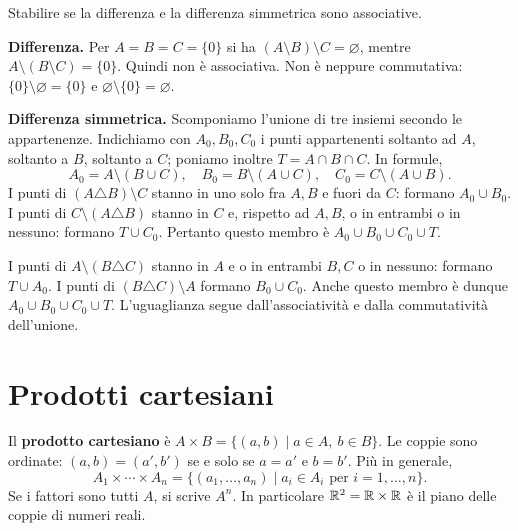 \begin{esercizio}
Stabilire se la differenza e la differenza simmetrica sono associative.
\end{esercizio}
\begin{svolgimento}
\textbf{Differenza.} Per $A=B=C=\{0\}$ si ha $(A\setminus B)\setminus C=\varnothing$, mentre $A\setminus(B\setminus C)=\{0\}$. Quindi non è associativa. Non è neppure commutativa: $\{0\}\setminus\varnothing=\{0\}$ e $\varnothing\setminus\{0\}=\varnothing$.

\textbf{Differenza simmetrica.} Scomponiamo l'unione di tre insiemi secondo le appartenenze. Indichiamo con $A_0,B_0,C_0$ i punti appartenenti soltanto ad $A$, soltanto a $B$, soltanto a $C$; poniamo inoltre $T=A\cap B\cap C$. In formule,
\[
A_0=A\setminus(B\cup C),\quad B_0=B\setminus(A\cup C),\quad C_0=C\setminus(A\cup B).
\]
 I punti di $(A\triangle B)\setminus C$ stanno in uno solo fra $A,B$ e fuori da $C$: formano $A_0\cup B_0$. I punti di $C\setminus(A\triangle B)$ stanno in $C$ e, rispetto ad $A,B$, o in entrambi o in nessuno: formano $T\cup C_0$. Pertanto questo membro è $A_0\cup B_0\cup C_0\cup T$.

 I punti di $A\setminus(B\triangle C)$ stanno in $A$ e o in entrambi $B,C$ o in nessuno: formano $T\cup A_0$. I punti di $(B\triangle C)\setminus A$ formano $B_0\cup C_0$. Anche questo membro è dunque $A_0\cup B_0\cup C_0\cup T$. L'uguaglianza segue dall'associatività e dalla commutatività dell'unione.
\end{svolgimento}

\begin{schema}
\end{schema}

\section{Prodotti cartesiani}
\begin{definizione}
Il \textbf{prodotto cartesiano} è $A\times B=\{(a,b)\mid a\in A,\ b\in B\}$. Le coppie sono ordinate: $(a,b)=(a',b')$ se e solo se $a=a'$ e $b=b'$. Più in generale,
\[
A_1\times\cdots\times A_n=\{(a_1,\ldots,a_n)\mid a_i\in A_i\text{ per }i=1,\ldots,n\}.
\]
Se i fattori sono tutti $A$, si scrive $A^n$. In particolare $\mathbb{R}^2=\mathbb{R}\times\mathbb{R}$ è il piano delle coppie di numeri reali.
\end{definizione}

